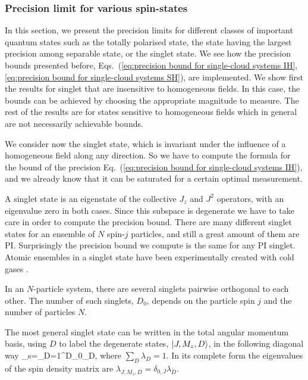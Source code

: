 \subsubsection{Precision limit for various spin-states}

In this section, we present the precision limits for different classes of
important quantum states such as the totally polarised state,
the state having the largest precision among separable state,
or the singlet state.
We see how the precision bounds presented before, Eqs.~(\ref{eq:precision
bound for single-cloud systems IH}, \ref{eq:precision bound for single-cloud
systems SH}), are implemented.
We show first the results for singlet that are insensitive to homogeneous
fields.
In this case, the bounds can be achieved by choosing
the appropriate magnitude to measure.
The rest of the results are for states sensitive to homogeneous
fields which in general are not necessarily achievable bounds.


We consider now the singlet state, which is invariant under the influence
of a homogeneous field along any direction.
So we have to compute the formula for the bound
of the precision Eq.~(\ref{eq:precision bound for single-cloud systems IH}),
and we already know that it can be saturated for a
certain optimal measurement.

A singlet state is an eigenstate of the collective $J_z$ and $J^2$
operators, with an eigenvalue zero in both cases.
Since this subspace is degenerate we have to take care in order to compute the
precision bound. There are many different singlet states for an ensemble of $N$
spin-$j$ particles, and still a great amount of them are PI.
Surprisingly the precision bound we compute is the same
for any PI singlet. Atomic ensembles in a singlet state have been experimentally
created with cold gases \citep{Toth2010,Behbood2014}.

In an $N$-particle system, there are several singlets pairwise orthogonal to each other. The number of such singlets, $D_0$, depends on the particle spin $j$ and the number of particles $N$.

The most general singlet state can be written in the total angular momentum basis, using $D$ to label the degenerate states, $\vert J,M_z,D \rangle$, in the following diagonal way
\be
\rho_{\rm s}=\sum_{D=1}^{D_0}\lambda_D,
\label{eq:definition of a general singlet}
\ee
where $\sum_D \lambda_D=1$.
In its complete form the eigenvalues of the spin density matrix are $\lambda_{J,M_z,D}=\delta_{0,J}\lambda_D$.

